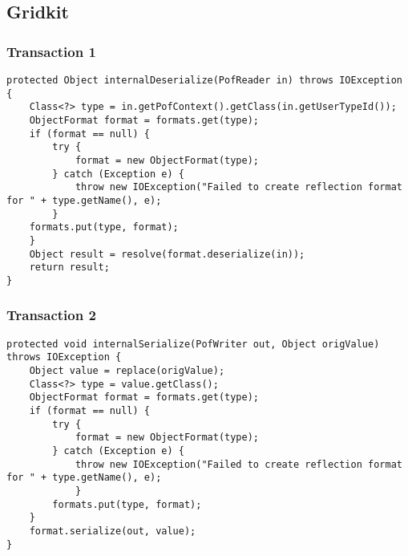 %
%
%
%

\subsection{Gridkit}
\subsubsection{Transaction 1}
\begin{lstlisting}
protected Object internalDeserialize(PofReader in) throws IOException {
	Class<?> type = in.getPofContext().getClass(in.getUserTypeId());
	ObjectFormat format = formats.get(type);
	if (format == null) {
		try {
			format = new ObjectFormat(type);
		} catch (Exception e) {
			throw new IOException("Failed to create reflection format for " + type.getName(), e);
		}
	formats.put(type, format);
	}
	Object result = resolve(format.deserialize(in));
	return result;
}
\end{lstlisting}

%
%
%
%

\subsubsection{Transaction 2}
\begin{lstlisting}
protected void internalSerialize(PofWriter out, Object origValue) throws IOException {
	Object value = replace(origValue);
	Class<?> type = value.getClass();
	ObjectFormat format = formats.get(type);
	if (format == null) {
		try {
			format = new ObjectFormat(type);
		} catch (Exception e) {
			throw new IOException("Failed to create reflection format for " + type.getName(), e);
			}
		formats.put(type, format);
	}
	format.serialize(out, value);
}
\end{lstlisting}


%
%
%
